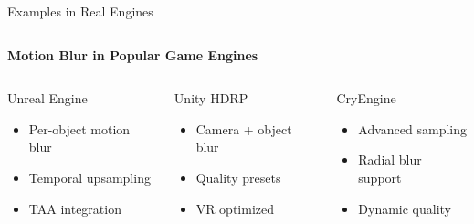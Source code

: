 \documentclass[aspectratio=169]{beamer}
\begin{document}
\begin{frame}{Examples in Real Engines}
    \begin{columns}[t]
        \begin{column}{\textwidth}
            \centering
            \textbf{\Large Motion Blur in Popular Game Engines}
        \end{column}
    \end{columns}
    
    \vspace{0.05cm}
    
    \begin{columns}[t]
        \begin{column}{0.32\textwidth}
            \begin{block}{Unreal Engine}
                \begin{itemize}
                    \item Per-object motion blur
                    \item Temporal upsampling
                    \item TAA integration
                \end{itemize}
            \end{block}
        \end{column}
        
        \begin{column}{0.32\textwidth}
            \begin{block}{Unity HDRP}
                \begin{itemize}
                    \item Camera + object blur
                    \item Quality presets
                    \item VR optimized
                \end{itemize}
            \end{block}
        \end{column}
        
        \begin{column}{0.32\textwidth}
            \begin{block}{CryEngine}
                \begin{itemize}
                    \item Advanced sampling
                    \item Radial blur support
                    \item Dynamic quality
                \end{itemize}
            \end{block}
        \end{column}
    \end{columns}
    

\end{frame}
\end{document}
